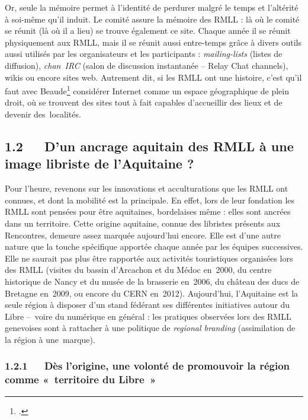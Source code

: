 \documentclass{FramateX}
\begin{document}
\begin{refsection}
Or, seule la mémoire permet à l'identité de perdurer malgré le temps et
l'altérité à soi-même qu'il induit. Le comité assure la mémoire des
RMLL : là où le comité se réunit (là où il a lieu) se trouve également
ce site. Chaque année il se réunit physiquement aux RMLL, mais il se
réunit aussi entre-temps grâce à divers outils aussi utilisés par les
organisateurs et les participants : \textit{mailing-lists} (listes de
diffusion), \textit{chan~IRC} (salon de discussion instantanée – Relay
Chat channels), wikis ou encore sites web. Autrement dit, si les RMLL
ont une histoire, c'est qu'il faut avec
Beaude\footnote{\cite{beaudeinternet2012}.} 
considérer Internet comme un espace géographique de plein droit, où se
trouvent des sites tout à fait capables d'accueillir des lieux et de
devenir des~localités.

\subsection*{1.2~~~D'un ancrage aquitain des RMLL à une image libriste de l'Aquitaine ?}
{}

Pour l'heure, revenons sur les innovations et acculturations que les
RMLL ont connues, et dont la mobilité est la principale. En effet, lors
de leur fondation les RMLL sont pensées pour être aquitaines,
bordelaises même : elles sont ancrées dans un territoire. Cette origine
aquitaine, connue des libristes présents aux Rencontres, demeure assez
marquée aujourd'hui encore. Elle est d'une autre nature que la touche
spécifique apportée chaque année par les équipes successives. Elle ne
saurait pas plus être rapportée aux activités touristiques organisées
lors des RMLL (visites du bassin d'Arcachon et du Médoc en~2000, du
centre historique de Nancy et du musée de la brasserie en~2006, du
château des ducs de Bretagne en~2009, ou encore du CERN en~2012).
Aujourd'hui, l'Aquitaine est la seule région à disposer d'un stand
fédérant ses différentes initiatives autour du Libre 
–~voire du numérique
en général : les pratiques observées lors des RMLL genevoises sont à
rattacher à une politique de \textit{regional branding} (assimilation de
la région à une~marque).

\subsubsection*{1.2.1~~~Dès l'origine, une volonté de promouvoir la région comme «~territoire du Libre~»}
{}


\end{refsection}
\end{document}

